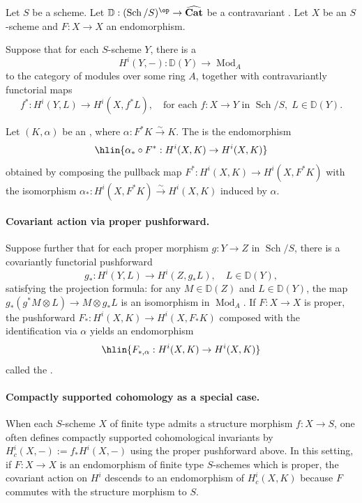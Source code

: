 \begin{definition} \label{definition:action_of_an_endomorphism_with_f_structure_on_cohomology_and_compactly_supported_cohomology_of_a_scheme}
    Let $S$ be a scheme. Let $\mathbb{D}: (\operatorname{Sch}/S)^{\op} \to \widehat{\mathbf{Cat}}$ be a contravariant . Let $X$ be an $S$-scheme and $F: X \to X$ an endomorphism.

    Suppose that for each $S$-scheme $Y$, there is a 
    $$H^i(Y, -): \mathbb{D}(Y) \to \operatorname{Mod}_A$$
    to the category of modules over some ring $A$, together with contravariantly functorial maps
    $$f^*: H^i(Y, L) \to H^i(X, f^*L), \quad \text{for each } f: X \to Y \text{ in } \operatorname{Sch}/S, \; L \in \mathbb{D}(Y).$$

    Let $(K, \alpha)$ be an , where $\alpha: F^*K \xrightarrow{\sim} K$. The  is the endomorphism
    $$\hlin{\alpha_* \circ F^*: H^i(X, K) \to H^i(X, K)}$$
    obtained by composing the pullback map $F^*: H^i(X, K) \to H^i(X, F^*K)$ with the isomorphism $\alpha_*: H^i(X, F^*K) \xrightarrow{\sim} H^i(X, K)$ induced by $\alpha$.

    \paragraph{Covariant action via proper pushforward.} Suppose further that for each proper morphism $g: Y \to Z$ in $\operatorname{Sch}/S$, there is a covariantly functorial pushforward
    $$g_*: H^i(Y, L) \to H^i(Z, g_*L), \quad L \in \mathbb{D}(Y),$$
    satisfying the projection formula: for any $M \in \mathbb{D}(Z)$ and $L \in \mathbb{D}(Y)$, the map $g_*(g^*M \otimes L) \to M \otimes g_*L$ is an isomorphism in $\operatorname{Mod}_A$. If $F: X \to X$ is proper, the pushforward $F_*: H^i(X, K) \to H^i(X, F_*K)$ composed with the identification via $\alpha$ yields an endomorphism
    $$\hlin{F_{*,\alpha}: H^i(X, K) \to H^i(X, K)}$$
    called the .

    \paragraph{Compactly supported cohomology as a special case.} When each $S$-scheme $X$ of finite type admits a structure morphism $f: X \to S$, one often defines compactly supported cohomological invariants by $H_c^i(X, -) := f_* H^i(X, -)$ using the proper pushforward above. In this setting, if $F: X \to X$ is an endomorphism of finite type $S$-schemes which is proper, the covariant action on $H^i$ descends to an endomorphism of $H_c^i(X, K)$ because $F$ commutes with the structure morphism to $S$.


\end{definition}
